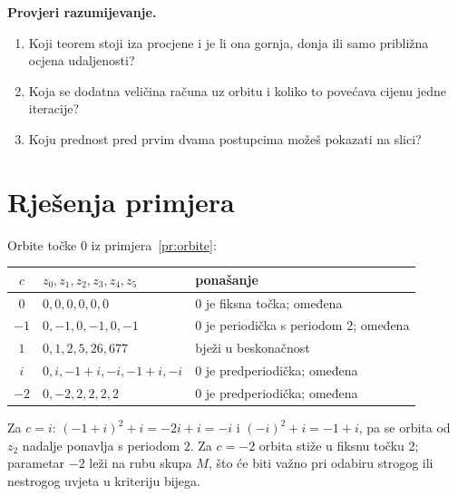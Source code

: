 \documentclass[11pt,a4paper]{article}
\theoremstyle{definition}
\theoremstyle{plain}
\newenvironment{pitanja}
  {\par\noindent\textbf{\color{orange!70!black}Provjeri razumijevanje.}
   \begin{enumerate}[label=\arabic*., nosep]}
  {\end{enumerate}\medskip}
\begin{document}
\begin{pitanja}
  \item Koji teorem stoji iza procjene i je li ona gornja, donja ili samo
        približna ocjena udaljenosti?
  \item Koja se dodatna veličina računa uz orbitu i koliko to povećava cijenu
        jedne iteracije?
  \item Koju prednost pred prvim dvama postupcima možeš pokazati na slici?
\end{pitanja}

\appendix
\section{Rješenja primjera}
\label{dod:rjesenja}

Orbite točke $0$ iz primjera~\ref{pr:orbite}:

\begin{center}
\renewcommand{\arraystretch}{1.2}
\begin{tabular}{c|l|l}
  $c$ & $z_0, z_1, z_2, z_3, z_4, z_5$ & ponašanje \\ \hline
  $0$  & $0, 0, 0, 0, 0, 0$ & $0$ je fiksna točka; omeđena \\
  $-1$ & $0, -1, 0, -1, 0, -1$ & $0$ je periodička s periodom $2$; omeđena \\
  $1$  & $0, 1, 2, 5, 26, 677$ & bježi u beskonačnost \\
  $i$  & $0, i, -1+i, -i, -1+i, -i$ & $0$ je predperiodička; omeđena \\
  $-2$ & $0, -2, 2, 2, 2, 2$ & $0$ je predperiodička; omeđena \\
\end{tabular}
\end{center}

Za $c = i$: $(-1+i)^2 + i = -2i + i = -i$ i $(-i)^2 + i = -1 + i$, pa se
orbita od $z_2$ nadalje ponavlja s periodom $2$. Za $c = -2$ orbita stiže u
fiksnu točku $2$; parametar $-2$ leži na rubu skupa $M$, što će biti važno
pri odabiru strogog ili nestrogog uvjeta u kriteriju bijega.



\end{document}
